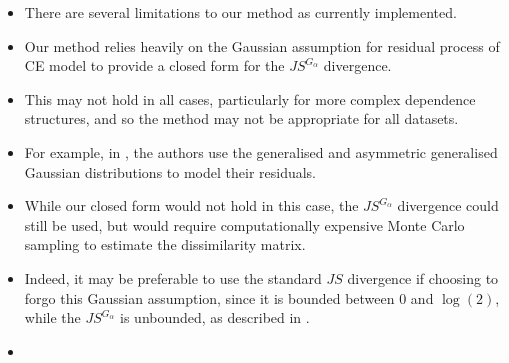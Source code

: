 \documentclass{article}
\numberwithin{equation}{section}
\begin{document}
\vspace{1cm}

\begin{itemize}
  \item There are several limitations to our method as currently implemented.
  \item Our method relies heavily on the Gaussian assumption for residual process of CE model to provide a closed form for the $JS^{G_{\alpha}}$ divergence.
  \item This may not hold in all cases, particularly for more complex dependence structures, and so the method may not be appropriate for all datasets.
  \item For example, in \citet{Farrell2025}, the authors use the generalised and asymmetric generalised Gaussian distributions to model their residuals. 
  \item While our closed form would not hold in this case, the $JS^{G_{\alpha}}$ divergence could still be used, but would require computationally expensive Monte Carlo sampling to estimate the dissimilarity matrix.
  \item Indeed, it may be preferable to use the standard $JS$ divergence if choosing to forgo this Gaussian assumption, since it is bounded between 0 and $\log{(2)}$, while the $JS^{G_{\alpha}}$ is unbounded, as described in \citet{Thiagarajan2025}.
  \item 
\end{itemize}

\vspace{1cm}
\end{document}

